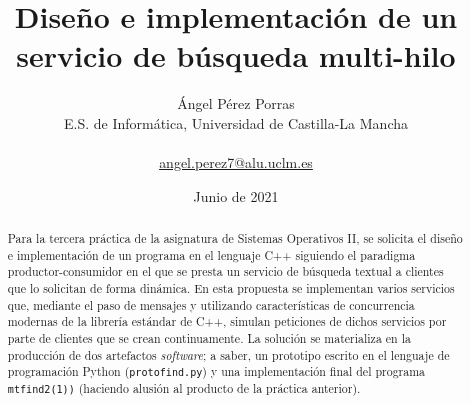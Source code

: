 \documentclass[a4paper]{article}
\title{
	\fontfamily{phv}\selectfont
	\textbf{Diseño e implementación de un servicio de búsqueda multi-hilo}
}
\author{
	\fontfamily{phv}\selectfont
	Ángel Pérez Porras \\
	\fontfamily{phv}\selectfont
	E.S. de Informática, Universidad de Castilla-La Mancha \\ \\
	\fontfamily{phv}\selectfont
	\hyperlink{mailto:angel.perez7@alu.uclm.es}{angel.perez7@alu.uclm.es}
}
\date{\fontfamily{phv}\selectfont Junio de 2021}
\begin{document}
	\maketitle
	
	\begin{abstract}
		Para la tercera práctica de la asignatura de Sistemas Operativos II, se solicita el diseño e implementación de un programa en el lenguaje C++ siguiendo el paradigma productor-consumidor en el que se presta un servicio de búsqueda textual a clientes que lo solicitan de forma dinámica. En esta propuesta se implementan varios servicios que, mediante el paso de mensajes y utilizando características de concurrencia modernas de la librería estándar de C++, simulan peticiones de dichos servicios por parte de clientes que se crean continuamente. La solución se materializa en la producción de dos artefactos \textit{software}; a saber, un prototipo escrito en el lenguaje de programación Python (\texttt{protofind.py}) y una implementación final del programa \texttt{mtfind2(1))} (haciendo alusión al producto de la práctica anterior).
	\end{abstract}

	\begin{section}
				
	\end{section}
\end{document}
